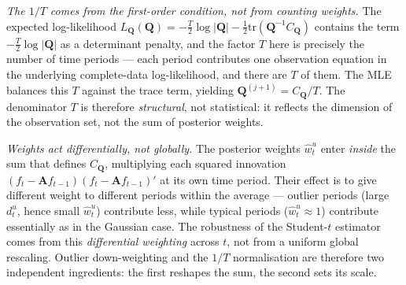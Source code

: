 \documentclass[11pt, a4paper, oneside]{article}
\newcommand{\mA}{\mathbf{A}}
\newcommand{\mQ}{\mathbf{Q}}
\begin{document}
\emph{The $1/T$ comes from the first-order condition, not from
counting weights.} The expected log-likelihood
$L_\mQ(\mQ) = -\frac{T}{2}\log|\mQ| - \frac{1}{2}\mathrm{tr}(\mQ^{-1} C_\mQ)$
contains the term $-\frac{T}{2}\log|\mQ|$ as a determinant penalty,
and the factor $T$ here is precisely the number of time periods —
each period contributes one observation equation in the underlying
complete-data log-likelihood, and there are $T$ of them. The MLE
balances this $T$ against the trace term, yielding
$\mQ^{(j+1)} = C_\mQ / T$. The denominator $T$ is therefore
\emph{structural}, not statistical: it reflects the dimension of the
observation set, not the sum of posterior weights.

\emph{Weights act differentially, not globally.} The posterior
weights $\hat{w}^u_t$ enter \emph{inside} the sum that defines
$C_\mQ$, multiplying each squared innovation
$(f_t - \mA f_{t-1})(f_t - \mA f_{t-1})'$ at its own time period.
Their effect is to give different weight to different periods within
the average — outlier periods (large $d^u_t$, hence small
$\hat{w}^u_t$) contribute less, while typical periods
($\hat{w}^u_t \approx 1$) contribute essentially as in the Gaussian
case. The robustness of the Student-$t$ estimator comes from this
\emph{differential weighting} across $t$, not from a uniform global
rescaling. Outlier down-weighting and the $1/T$ normalisation are
therefore two independent ingredients: the first reshapes the sum,
the second sets its scale.
\end{document}
